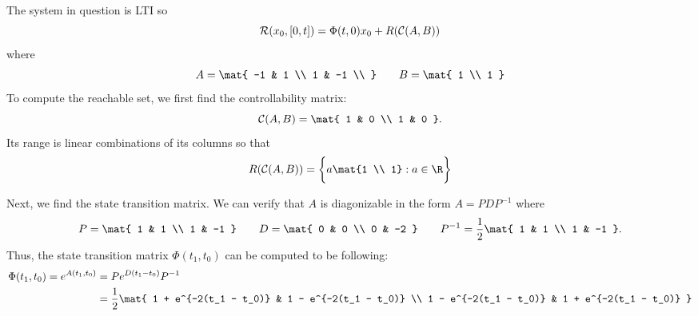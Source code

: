 \documentclass{homework}
\begin{document}
\begin{letterenum}
\item 
The system in question is LTI so
\begin{equation}
    \mathcal{R}(x_0, [0, t]) = \Phi(t, 0) x_0 + R(\mathcal{C}(A, B))
    \label{eq:reachability}
\end{equation}
where
\begin{equation*}
    A = \mat{
        -1 & 1 \\
        1 & -1 \\
    } \qquad B = \mat{
        1 \\ 1
    }
\end{equation*}
To compute the reachable set, we first find the controllability matrix:
\begin{equation*}
    \contr(A, B) = \mat{
        1 & 0 \\
        1 & 0
    }.
\end{equation*}
Its range is linear combinations of its columns so that
\begin{equation*}
    R(\contr(A, B)) = \biggl\{
        a \mat{1 \\ 1}: a \in \R
    \biggr\}
\end{equation*}

Next, we find the state transition matrix.
We can verify that $A$ is diagonizable in the form $A = PDP^{-1}$ where
\begin{equation*}
    P = \mat{
        1 & 1 \\
        1 & -1
    } \qquad D = \mat{
        0 & 0 \\
        0 & -2
    } \qquad P^{-1} = \frac{1}{2} \mat{
        1 & 1 \\
        1 & -1
    }.
\end{equation*}
Thus, the state transition matrix $\Phi(t_1, t_0)$ can be computed
to be following:
\begin{align}
    \Phi(t_1, t_0) = e^{A(t_1, t_0)} &= P e^{D(t_1 - t_0)} P^{-1} \\
        &= \frac{1}{2} \mat{
            1 + e^{-2(t_1 - t_0)} & 1 - e^{-2(t_1 - t_0)} \\
            1 - e^{-2(t_1 - t_0)} & 1 + e^{-2(t_1 - t_0)}
        }
        \label{eq:state-transition}
\end{align}


\end{letterenum}
\end{document}

